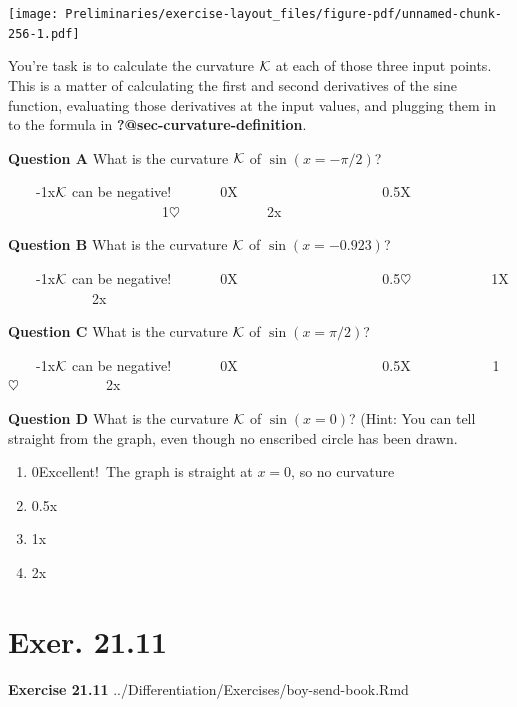 \documentclass[
  letterpaper,
  DIV=11,
  numbers=noendperiod,
  oneside]{article}
\providecommand{\tightlist}{%
  \setlength{\itemsep}{0pt}\setlength{\parskip}{0pt}}\usepackage{longtable,booktabs,array}
\begin{document}
\begin{multicols}{2}
\texttt{[image: Preliminaries/exercise-layout\_files/figure-pdf/unnamed-chunk-256-1.pdf]}

You're task is to calculate the curvature \(\cal K\) at each of those
three input points. This is a matter of calculating the first and second
derivatives of the sine function, evaluating those derivatives at the
input values, and plugging them in to the formula in
\textbf{?@sec-curvature-definition}.

\textbf{Question A} What is the curvature \(\cal K\) of
\(\sin(x=-\pi/2)\)?

~~~~{-1{x\(\cal K\) can be negative!}}~~~~~~~{0{︎X
~~~~~~~~~~~~~}}~~~~~~~{0.5{︎X
~~~~~~~~~~~~~~~}}~~~~~~~{1{\(\heartsuit\ \)~~~~~}}~~~~~~~{2{x}}

\textbf{Question B} What is the curvature \(\cal K\) of
\(\sin(x=-0.923)\)?

~~~~{-1{x\(\cal K\) can be negative!}}~~~~~~~{0{︎X
~~~~~~~~~~~~~}}~~~~~~~{0.5{\(\heartsuit\ \)~~~~}}~~~~~~~{1{︎X
~~~~~}}~~~~~~~{2{x}}

\textbf{Question C} What is the curvature \(\cal K\) of
\(\sin(x=\pi/2)\)?

~~~~{-1{x\(\cal K\) can be negative!}}~~~~~~~{0{︎X
~~~~~~~~~~~~~}}~~~~~~~{0.5{︎X
~~~~}}~~~~~~~{1{\(\heartsuit\ \)~~~~~}}~~~~~~~{2{x}}

\textbf{Question D} What is the curvature \(\cal K\) of \(\sin(x=0)\)?
(Hint: You can tell straight from the graph, even though no enscribed
circle has been drawn.

\begin{enumerate}
\def\labelenumi{\roman{enumi}.}
\tightlist
\item
  {0{Excellent!~The graph is straight at \(x=0\), so no curvature}}\\
\item
  {0.5{x~~~~~~~~~~~~~~~~~~~}}\\
\item
  {1{x~~~~~~~~~~~~~~~~~~~~~~~~~~~~~~}}\\
\item
  {2{x}}
\end{enumerate}

\hypertarget{exer.-21.11}{%
\section*{Exer. 21.11}\label{exer.-21.11}}

\textbf{Exercise 21.11} ../Differentiation/Exercises/boy-send-book.Rmd


\end{multicols}
\end{document}
